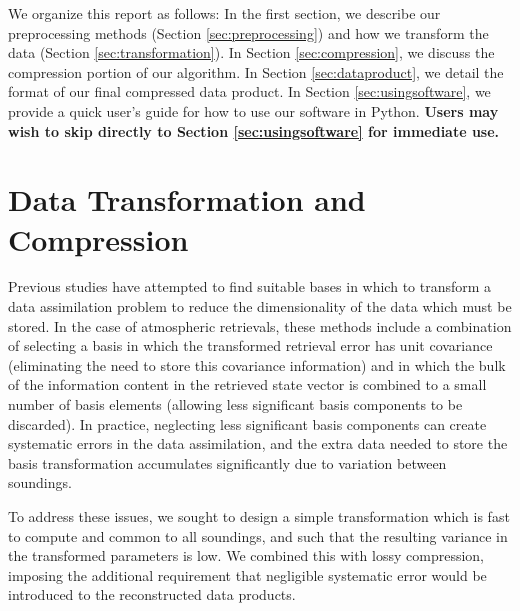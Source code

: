 \documentclass{article}
\begin{document}
We organize this report as follows: In the first section, we describe our preprocessing methods (Section \ref{sec:preprocessing}) and how we transform the data (Section \ref{sec:transformation}). In Section \ref{sec:compression}, we discuss the compression portion of our algorithm. In Section \ref{sec:dataproduct}, we detail the format of our final compressed data product. In Section \ref{sec:usingsoftware}, we provide a quick user's guide for how to use our software in Python. \textbf{Users may wish to skip directly to Section \ref{sec:usingsoftware} for immediate use.} 

\section{Data Transformation and Compression} 
Previous studies \cite{Migliorini2008, Mizzi2016} have attempted to find suitable bases in which to transform a data assimilation problem to reduce the dimensionality of the data which must be stored. In the case of atmospheric retrievals, these methods include a combination of selecting a basis in which the transformed retrieval error has unit covariance (eliminating the need to store this covariance information) and in which the bulk of the information content in the retrieved state vector is combined to a small number of basis elements (allowing less significant basis components to be discarded). In practice, neglecting less significant basis components can create systematic errors in the data assimilation, and the extra data needed to store the basis transformation accumulates significantly due to variation between soundings. 

To address these issues, we sought to design a simple transformation which is fast to compute and common to all soundings, and such that the resulting variance in the transformed parameters is low. We combined this with lossy compression, imposing the additional requirement that negligible systematic error would be introduced to the reconstructed data products. 
\end{document}
